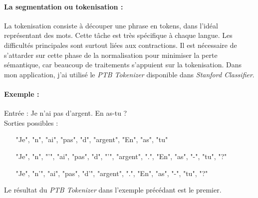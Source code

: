                 \paragraph{La segmentation ou tokenisation :}
                    La tokenisation consiste à découper une phrase en tokens, dans l'idéal représentant des mots. Cette tâche est très spécifique à chaque langue. Les difficultés principales sont surtout liées aux contractions. Il est nécessaire de s'attarder sur cette phase de la normalisation pour minimiser la perte sémantique, car beaucoup de traitements s'appuient sur la tokenisation. Dans mon application, j'ai utilisé le \textit{PTB Tokenizer} disponible dans \textit{Stanford Classifier}.

                    \paragraph{Exemple :}
                    Entrée : \og Je n'ai pas d'argent. En as-tu ? \fg\\
                    Sorties possibles :
                    \begin{itemize}
                        \item ["Je", "n", "ai", "pas", "d", "argent", "En", "as", "tu"]
                        \item ["Je", "n", "'", "ai", "pas", "d", "'", "argent", ".", "En", "as", "-", "tu", "?"]
                        \item ["Je", "n'", "ai", "pas", "d'", "argent", ".", "En", "as", "-", "tu", "?"]
                    \end{itemize}
                    Le résultat du \textit{PTB Tokenizer} dans l'exemple précédant est le premier.

